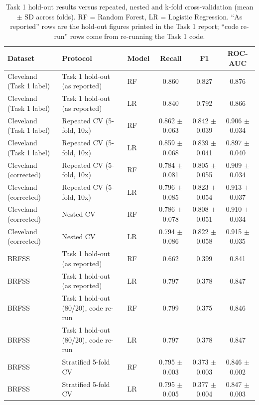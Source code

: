\begin{table}[h]
\caption{Task 1 hold-out results versus repeated, nested and k-fold cross-validation (mean $\pm$ SD across folds). RF = Random Forest, LR = Logistic Regression. ``As reported'' rows are the hold-out figures printed in the Task 1 report; ``code re-run'' rows come from re-running the Task 1 code.}
\label{tab:cv}
\small\setlength\tabcolsep{4pt}
\begin{tabular}{lllccc}
\toprule
Dataset & Protocol & Model & Recall & F1 & ROC-AUC\\
\midrule
Cleveland (Task 1 label) & Task 1 hold-out (as reported) & RF & 0.860 & 0.827 & 0.876\\
Cleveland (Task 1 label) & Task 1 hold-out (as reported) & LR & 0.840 & 0.792 & 0.866\\
Cleveland (Task 1 label) & Repeated CV (5-fold, 10x) & RF & 0.862 $\pm$ 0.063 & 0.842 $\pm$ 0.039 & 0.906 $\pm$ 0.034\\
Cleveland (Task 1 label) & Repeated CV (5-fold, 10x) & LR & 0.859 $\pm$ 0.068 & 0.839 $\pm$ 0.041 & 0.897 $\pm$ 0.040\\
Cleveland (corrected) & Repeated CV (5-fold, 10x) & RF & 0.784 $\pm$ 0.081 & 0.805 $\pm$ 0.055 & 0.909 $\pm$ 0.034\\
Cleveland (corrected) & Repeated CV (5-fold, 10x) & LR & 0.796 $\pm$ 0.085 & 0.823 $\pm$ 0.054 & 0.913 $\pm$ 0.037\\
Cleveland (corrected) & Nested CV & RF & 0.786 $\pm$ 0.078 & 0.808 $\pm$ 0.051 & 0.910 $\pm$ 0.034\\
Cleveland (corrected) & Nested CV & LR & 0.794 $\pm$ 0.086 & 0.822 $\pm$ 0.058 & 0.915 $\pm$ 0.035\\
\midrule
BRFSS & Task 1 hold-out (as reported) & RF & 0.662 & 0.399 & 0.841\\
BRFSS & Task 1 hold-out (as reported) & LR & 0.797 & 0.378 & 0.847\\
BRFSS & Task 1 hold-out (80/20), code re-run & RF & 0.799 & 0.375 & 0.846\\
BRFSS & Task 1 hold-out (80/20), code re-run & LR & 0.797 & 0.378 & 0.847\\
BRFSS & Stratified 5-fold CV & RF & 0.795 $\pm$ 0.003 & 0.373 $\pm$ 0.003 & 0.846 $\pm$ 0.002\\
BRFSS & Stratified 5-fold CV & LR & 0.795 $\pm$ 0.005 & 0.377 $\pm$ 0.004 & 0.847 $\pm$ 0.003\\
\bottomrule
\end{tabular}
\end{table}